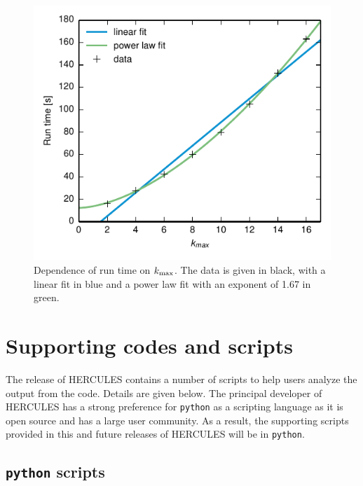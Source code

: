 \documentclass[11pt, oneside]{article}   	%
\begin{document}
\begin{figure}[]
   \centering
   \includegraphics[]{Figures/Run_time_kmax.pdf} 
   \caption{Dependence of run time on $k_{\rm max}$. The data is given in black, with a linear fit in blue and a power law fit with an exponent of 1.67 in green.}
   \label{HUG:fig:run_time_kmax}
\end{figure}

\clearpage

\section{Supporting codes and scripts}
\label{HUG:sec:scripts}

The release of HERCULES contains a number of scripts to help users analyze the output from the code. Details are given below. The principal developer of HERCULES has a strong preference for \texttt{python} as a scripting language as it is open source and has a large user community. As a result, the supporting scripts provided in this and future releases of HERCULES will be in \texttt{python}. 

\subsection{\texttt{python} scripts}
\end{document}
